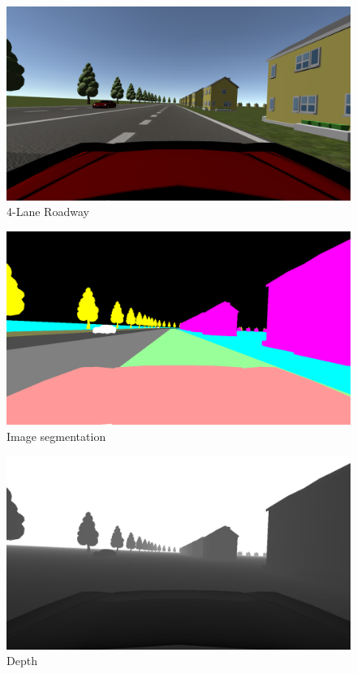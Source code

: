 \begin{figure}[H]
  \centering
  \includegraphics[width=\textwidth]{images/Chapter3/_img.jpg}
  \caption{4-Lane Roadway}
  \label{fig:lane_4}
\end{figure}
\begin{figure}[H]
  \centering
  \includegraphics[width=\textwidth]{images/Chapter3/_layer.jpg}
  \caption{Image segmentation}
  \label{fig:image_segmentation}
\end{figure}
\begin{figure}[H]
  \centering
  \includegraphics[width=\textwidth]{images/Chapter3/_depth.jpg}
  \caption{Depth}
  \label{fig:depth}
\end{figure}
